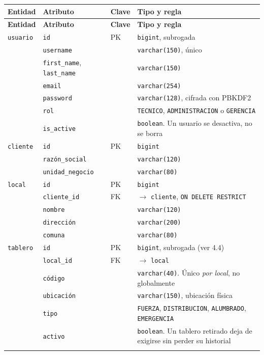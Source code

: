 \documentclass[10pt,letterpaper]{article}
\begin{document}
\begin{longtable}{@{}p{2.9cm}p{3.6cm}p{1.6cm}p{6.6cm}@{}}
\toprule
\textbf{Entidad} & \textbf{Atributo} & \textbf{Clave} & \textbf{Tipo y regla} \\
\midrule
\endfirsthead
\toprule
\textbf{Entidad} & \textbf{Atributo} & \textbf{Clave} & \textbf{Tipo y regla} \\
\midrule
\endhead

\texttt{usuario} & \texttt{id} & PK & \texttt{bigint}, subrogada \\
 & \texttt{username} & & \texttt{varchar(150)}, único \\
 & \texttt{first\_name}, \texttt{last\_name} & & \texttt{varchar(150)} \\
 & \texttt{email} & & \texttt{varchar(254)} \\
 & \texttt{password} & & \texttt{varchar(128)}, cifrada con PBKDF2 \\
 & \texttt{rol} & & \texttt{TECNICO}, \texttt{ADMINISTRACION} o \texttt{GERENCIA} \\
 & \texttt{is\_active} & & \texttt{boolean}. Un usuario se desactiva, no se borra \\
\addlinespace

\texttt{cliente} & \texttt{id} & PK & \texttt{bigint} \\
 & \texttt{razón\_social} & & \texttt{varchar(120)} \\
 & \texttt{unidad\_negocio} & & \texttt{varchar(80)} \\
\addlinespace

\texttt{local} & \texttt{id} & PK & \texttt{bigint} \\
 & \texttt{cliente\_id} & FK & $\to$ \texttt{cliente}, \texttt{ON DELETE RESTRICT} \\
 & \texttt{nombre} & & \texttt{varchar(120)} \\
 & \texttt{dirección} & & \texttt{varchar(200)} \\
 & \texttt{comuna} & & \texttt{varchar(80)} \\
\addlinespace

\texttt{tablero} & \texttt{id} & PK & \texttt{bigint}, subrogada (ver 4.4) \\
 & \texttt{local\_id} & FK & $\to$ \texttt{local} \\
 & \texttt{código} & & \texttt{varchar(40)}. Único \emph{por local}, no globalmente \\
 & \texttt{ubicación} & & \texttt{varchar(150)}, ubicación física \\
 & \texttt{tipo} & & \texttt{FUERZA}, \texttt{DISTRIBUCION}, \texttt{ALUMBRADO}, \texttt{EMERGENCIA} \\
 & \texttt{activo} & & \texttt{boolean}. Un tablero retirado deja de exigirse sin perder su historial \\
\addlinespace


\end{longtable}
\end{document}
